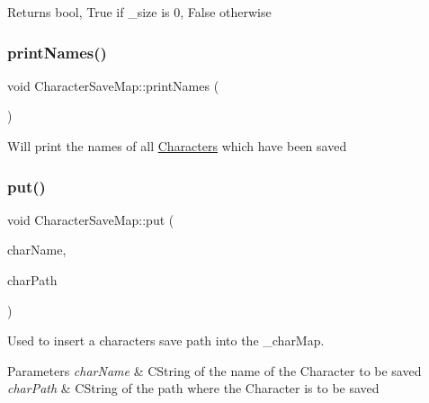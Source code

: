 \begin{DoxyReturn}{Returns}
bool, True if \+\_\+size is 0, False otherwise 
\end{DoxyReturn}
\hypertarget{class_character_save_map_a4e62aa81be98017382c268a2e1165f09}{}\label{class_character_save_map_a4e62aa81be98017382c268a2e1165f09} 
\subsubsection{\texorpdfstring{print\+Names()}{printNames()}}
{\footnotesize\ttfamily void Character\+Save\+Map\+::print\+Names (\begin{DoxyParamCaption}{ }\end{DoxyParamCaption})}

Will print the names of all \hyperlink{class_characters}{Characters} which have been saved \hypertarget{class_character_save_map_a1b0d8a748f717733e02ca01d2492fc80}{}\label{class_character_save_map_a1b0d8a748f717733e02ca01d2492fc80} 
\subsubsection{\texorpdfstring{put()}{put()}}
{\footnotesize\ttfamily void Character\+Save\+Map\+::put (\begin{DoxyParamCaption}\item[{const C\+String \&}]{char\+Name,  }\item[{const C\+String \&}]{char\+Path }\end{DoxyParamCaption})}

Used to insert a character\textquotesingle{}s save path into the \+\_\+char\+Map. 
\begin{DoxyParams}{Parameters}
{\em char\+Name} & C\+String of the name of the Character to be saved \\
\hline
{\em char\+Path} & C\+String of the path where the Character is to be saved \\
\hline
\end{DoxyParams}
\hypertarget{class_character_save_map_a1daaac33e4d3550c29f6dd087d460209}{}\label{class_character_save_map_a1daaac33e4d3550c29f6dd087d460209} 
